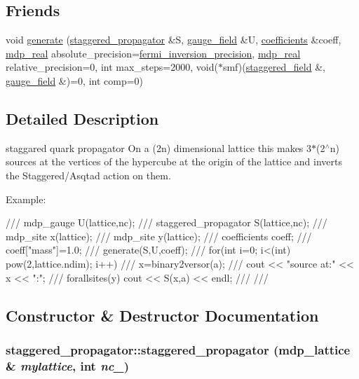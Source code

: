 \subsection*{Friends}
\begin{DoxyCompactItemize}
\item 
void \hyperlink{classstaggered__propagator_a7849b2db88d889afda04b4ee01476b64}{generate} (\hyperlink{classstaggered__propagator}{staggered\_\-propagator} \&S, \hyperlink{classgauge__field}{gauge\_\-field} \&U, \hyperlink{classcoefficients}{coefficients} \&coeff, \hyperlink{mdp__global__vars_8h_a049e4c1d4e74d644878a42f9909463e4}{mdp\_\-real} absolute\_\-precision=\hyperlink{fermiqcd__default__parameters_8h_ab11c95dc923c6bfd349bd67af277d59d}{fermi\_\-inversion\_\-precision}, \hyperlink{mdp__global__vars_8h_a049e4c1d4e74d644878a42f9909463e4}{mdp\_\-real} relative\_\-precision=0, int max\_\-steps=2000, void($\ast$smf)(\hyperlink{classstaggered__field}{staggered\_\-field} \&, \hyperlink{classgauge__field}{gauge\_\-field} \&)=0, int comp=0)
\end{DoxyCompactItemize}


\subsection{Detailed Description}
staggared quark propagator On a (2n) dimensional lattice this makes 3$\ast$(2$^\wedge$n) sources at the vertices of the hypercube at the origin of the lattice and inverts the Staggered/Asqtad action on them.

Example: \begin{DoxyVerb}
/// mdp_gauge U(lattice,nc);
/// staggered_propagator S(lattice,nc);
/// mdp_site x(lattice);
/// mdp_site y(lattice);
/// coefficients coeff;
/// coeff["mass"]=1.0;
/// generate(S,U,coeff);
/// for(int i=0; i<(int) pow(2,lattice.ndim); i++) {
///    x=binary2versor(a);
///    cout << "source at:" << x << "\nprop:\n"; 
///    forallsites(y) cout << S(x,a) << endl;
/// }
/// \end{DoxyVerb}
 

\subsection{Constructor \& Destructor Documentation}
\hypertarget{classstaggered__propagator_ad2abd9534d09d4f0af54a53ed4e092c6}{
\subsubsection[{staggered\_\-propagator}]{\setlength{\rightskip}{0pt plus 5cm}staggered\_\-propagator::staggered\_\-propagator ({\bf mdp\_\-lattice} \& {\em mylattice}, \/  int {\em nc\_\-})}}
\label{classstaggered__propagator_ad2abd9534d09d4f0af54a53ed4e092c6}


